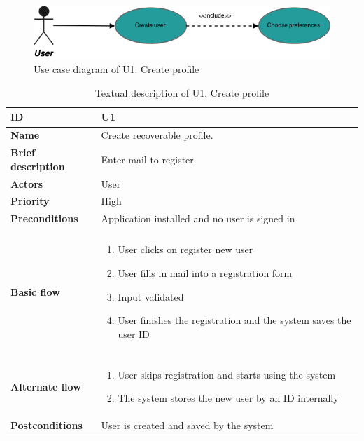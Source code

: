 \clearpage
\begin{figure}[hp]
	\includegraphics[width=\textwidth]{fig/U1}
	\centering
	\caption{Use case diagram of U1. Create profile}
	\label{Fig:U1}
\end{figure}

\begin{table}[hp]
	\renewcommand{\arraystretch}{1.5}
	\centering
	\caption{Textual description of U1. Create profile}
	\begin{tabular}[b]{|l | l|}\hline
		\textbf{ID} 				& U1									\\\hline
		\textbf{Name} 				& Create recoverable profile.			\\\hline
		\textbf{Brief description}	& Enter mail to register. 				\\\hline
		\textbf{Actors} 			& User									\\\hline
		\textbf{Priority}			& High									\\\hline
		\textbf{Preconditions}		& Application installed	and no user is signed in				\\\hline&\\[-2ex]
		\textbf{Basic flow}			& \begin{minipage}{5in}
									  \begin{enumerate}[noitemsep]
										\item User clicks on register new user
										\item User fills in mail into a registration form
										\item Input validated
										\item User finishes the registration and the system saves the user ID
									  \end{enumerate}						
									  \end{minipage}						\\\hline&\\[-2ex]
		\textbf{Alternate flow}		& \begin{minipage}{5in}
									  \begin{enumerate}[noitemsep]
										\item User skips registration and starts using the system
										\item The system stores the new user by an ID internally
									  \end{enumerate}
									 \end{minipage}							\\\hline
		\textbf{Postconditions}		& User is created and saved by the system\\\hline
	\end{tabular}
	\label{Tab:U1}
\end{table}

